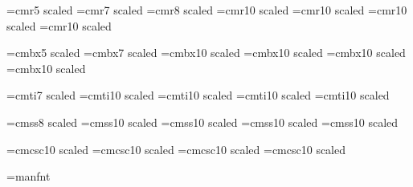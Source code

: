 
\font\fivecmr=cmr5 scaled 
\font\sevencmr=cmr7 scaled 
\font\eightcmr=cmr8 scaled 
\font\tencmr=cmr10 scaled 
\font\twelvecmr=cmr10 scaled 
\font\fourteencmr=cmr10 scaled 
\font\seventeencmr=cmr10 scaled 

\font\fivecmbx=cmbx5 scaled 
\font\sevencmbx=cmbx7 scaled 
\font\tencmbx=cmbx10 scaled 
\font\twelvecmbx=cmbx10 scaled 
\font\fourteencmbx=cmbx10 scaled 
\font\seventeencmbx=cmbx10 scaled 

\font\sevencmti=cmti7 scaled 
\font\tencmti=cmti10 scaled 
\font\twelvecmti=cmti10 scaled 
\font\fourteencmti=cmti10 scaled 
\font\seventeencmti=cmti10 scaled 

\font\eightcmss=cmss8 scaled 
\font\tencmss=cmss10 scaled 
\font\twelvecmss=cmss10 scaled 
\font\fourteencmss=cmss10 scaled 
\font\seventeencmss=cmss10 scaled 

\font\tencmcsc=cmcsc10 scaled 
\font\twelvecmcsc=cmcsc10 scaled 
\font\fourteencmcsc=cmcsc10 scaled 
\font\seventeencmcsc=cmcsc10 scaled 

\font\manual=manfnt



\def\\{\char92{}}          %
\def\lb{\char'173{}}       %
\def\rb{\char'175{}}       %
\def\sp{\char32{}}         %
